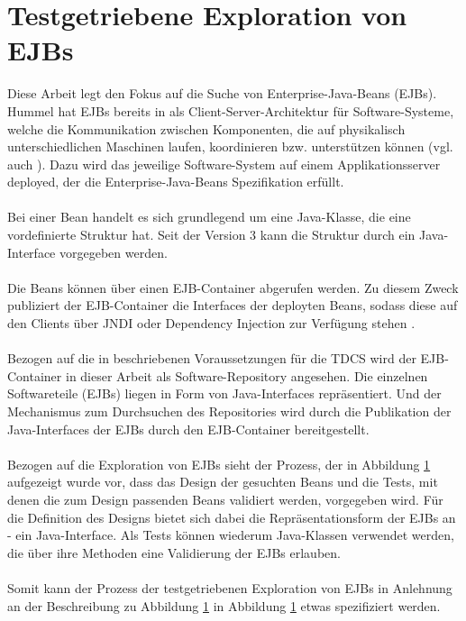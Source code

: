 \section{Testgetriebene Exploration von EJBs}
Diese Arbeit legt den Fokus auf die Suche von Enterprise-Java-Beans (EJBs). Hummel hat EJBs bereits in \cite{hummel08} als Client-Server-Architektur für Software-Systeme, welche die Kommunikation zwischen Komponenten, die auf physikalisch unterschiedlichen Maschinen laufen, koordinieren bzw. unterstützen können (vgl. auch \cite{ejbspec}). Dazu wird das jeweilige Software-System auf einem Applikationsserver deployed, der die Enterprise-Java-Beans Spezifikation \cite{ejbspec} erfüllt.
\\\\
Bei einer Bean handelt es sich grundlegend um eine Java-Klasse, die eine vordefinierte Struktur hat. Seit der Version 3 kann die Struktur durch ein Java-Interface vorgegeben werden\cite{ejbspec}.
\\\\
Die Beans können über einen EJB-Container abgerufen werden. Zu diesem Zweck publiziert der EJB-Container die Interfaces der deployten Beans, sodass diese auf den Clients über JNDI oder Dependency Injection zur Verfügung stehen \cite{ejbspec}.
\\\\
Bezogen auf die in \cite{hummel08} beschriebenen Voraussetzungen für die TDCS wird der EJB-Container in dieser Arbeit als Software-Repository angesehen. Die einzelnen Softwareteile (EJBs) liegen in Form von Java-Interfaces repräsentiert. Und der Mechanismus zum Durchsuchen des Repositories wird durch die Publikation der Java-Interfaces der EJBs durch den EJB-Container bereitgestellt.
\\\\
Bezogen auf die Exploration von EJBs sieht der Prozess, der in Abbildung \ref{} aufgezeigt wurde vor, dass das Design der gesuchten Beans und die Tests, mit denen die zum Design passenden Beans validiert werden, vorgegeben wird. Für die Definition des Designs bietet sich dabei die Repräsentationsform der EJBs an - ein Java-Interface. Als Tests können wiederum Java-Klassen verwendet werden, die über ihre Methoden eine Validierung der EJBs erlauben.
\\\\
Somit kann der Prozess der testgetriebenen Exploration von EJBs in Anlehnung an der Beschreibung zu Abbildung \ref{} in Abbildung \ref{} etwas spezifiziert werden.
\begin{figure}[h!]

\end{figure}
